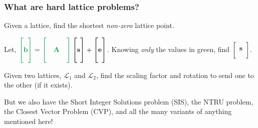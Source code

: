 \documentclass[
aspectratio=169, %
t, %
onlytextwidth, %
10pt, %
]{beamer}
\begin{document}
\begin{frame}
    \frametitle{What are hard lattice problems?}

    \begin{adjustwidth}{0cm}{0cm} %

        \begin{tcolorbox}[colback=ICLBlue!5!white,colframe=ICLBlue,title=\textbf{Definition:} Shortest Vector Problem (SVP)]
            Given a lattice, find the shortest \textit{non-zero} lattice point.
        \end{tcolorbox}

        \begin{tcolorbox}[colback=ICLBlue!5!white,colframe=ICLBlue,title=\textbf{Definition:} Learning With Errors Problem (LWE)]
            Let, $\color{ForestGreen} \begin{bmatrix} \\ \mathbf{b} \\ \\ \end{bmatrix} \color{black} = \color{ForestGreen} \begin{bmatrix} & & \\ & \mathbf{A} & \\ & & \end{bmatrix} \color{black} \begin{bmatrix} \\ \mathbf{s} \\ \\ \end{bmatrix} + \begin{bmatrix} \\ \mathbf{e} \\ \\ \end{bmatrix}$.
            Knowing \textit{only} the values in \color{ForestGreen} green\color{black}, find $\begin{bmatrix} \\ \mathbf{s} \\ \\ \end{bmatrix}$.
        \end{tcolorbox}
        \begin{tcolorbox}[colback=ICLBlue!5!white,colframe=ICLBlue,title=\textbf{Definition:} Lattice Isomorphism Problem (LIP)]
            Given two lattices, $\mathcal{L}_1$ and $\mathcal{L}_2$, find the scaling factor and rotation to send one to the other (if it exists).
        \end{tcolorbox}

        But we also have the Short Integer Solutions problem (SIS), the NTRU problem, the Closest Vector Problem (CVP), and all the many variants of anything mentioned here!

    \end{adjustwidth}
\end{frame}
\end{document}
